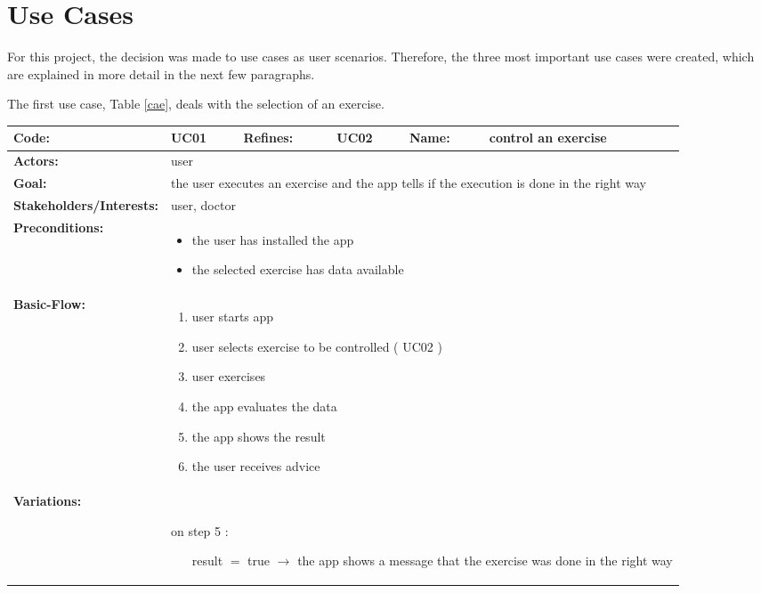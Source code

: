 \section{Use Cases}
For this project, the decision was made to use cases as user scenarios. Therefore, the three most important use cases were created, which are explained in more detail in the next few paragraphs.


The first use case, Table \ref{cae}, deals with the selection of an exercise.
\begin{table}[H]
	\begin{tabular}{|l|l|l|l|l|l|} \hline
		\textbf{Code:} & UC01 & \textbf{Refines:} & UC02 & \textbf{Name:} & control an exercise \\ \hline
		\textbf{Actors:} & \multicolumn{5}{l|}{user} \\ \hline
		\textbf{Goal:} & \multicolumn{5}{l|}{the user executes an exercise and the app tells if the execution is done in the right way} \\ \hline
		\textbf{Stakeholders/Interests:} & \multicolumn{5}{l|}{user, doctor} \\ \hline
		\textbf{Preconditions:} & \multicolumn{5}{l|}{\parbox{0.75\textwidth}{
			\begin{itemize}
				\item the user has installed the app
				\item the selected exercise has data available
			\end{itemize}
		}} \\ \hline
		\textbf{Basic-Flow:} & \multicolumn{5}{l|}{\parbox{0.75\textwidth}{
			\begin{enumerate}
				\item user starts app
				\item user selects exercise to be controlled ( UC02 )
				\item user exercises
				\item the app evaluates the data
				\item the app shows the result
				\item the user receives advice
			\end{enumerate}
		}} \\ \hline
		\textbf{Variations:} & \multicolumn{5}{l|}{\parbox{0.75\textwidth}{
			$ $\\on step 5 :
			\begin{itemize}[leftmargin=2.5cm]
				\item[result $=$ true ] $\rightarrow$ the app shows a message that the exercise was done in the right way 

\end{itemize}}}
\end{tabular}
\end{table}
